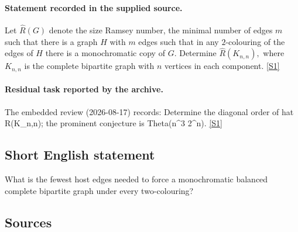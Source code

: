 \documentclass[11pt,a4paper]{article}
\newcommand{\sref}[2]{\hyperlink{source:#1:#2}{[S#2]}}
\begin{document}
\paragraph{Statement recorded in the supplied source.}
Let $\hat{R}(G)$ denote the size Ramsey number, the minimal number of edges $m$ such that there is a graph $H$ with $m$ edges such that in any $2$-colouring of the edges of $H$ there is a monochromatic copy of $G$.
Determine $ \hat{R}(K_{n,n}), $ where $K_{n,n}$ is the complete bipartite graph with $n$ vertices in each component. \sref{2177}{1}

\paragraph{Residual task reported by the archive.}

The embedded review (2026-08-17) records: Determine the diagonal order of hat R(K\_{n,n}); the prominent conjecture is Theta(n\textasciicircum{}3 2\textasciicircum{}n). \sref{2177}{1}

\subsection{Short English statement}

What is the fewest host edges needed to force a monochromatic balanced complete bipartite graph under every two-colouring?

\subsection{Sources}
\end{document}

